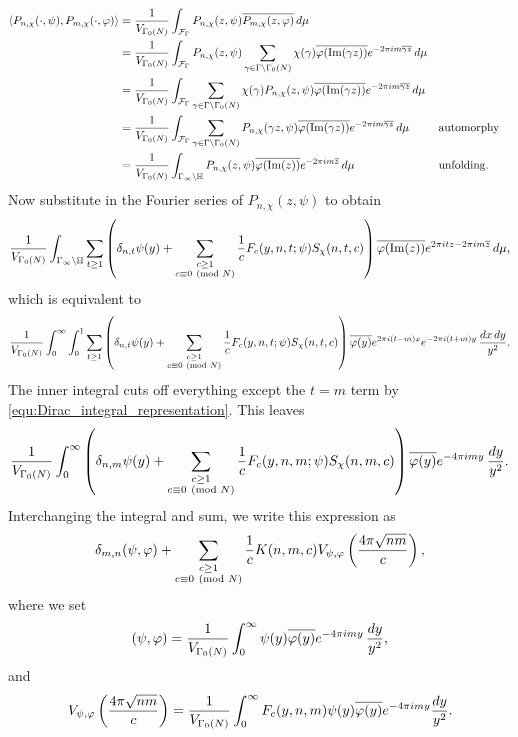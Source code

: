     \begin{align*}
      \langle P_{n,\chi}(\cdot,\psi),P_{m,\chi}(\cdot,\varphi)\rangle &= \frac{1}{V_{\Gamma_{0}(N)}}\int_{\mathcal{F}_{\Gamma}}P_{n,\chi}(z,\psi)\overline{P_{m,\chi}(z,\varphi)}\,d\mu \\
      &= \frac{1}{V_{\Gamma_{0}(N)}}\int_{\mathcal{F}_{\Gamma}}P_{n,\chi}(z,\psi)\sum_{\gamma \in \Gamma\backslash\Gamma_{0}(N)}\chi(\gamma)\overline{\varphi(\mathrm{Im}(\gamma z))}e^{-2\pi im\overline{\gamma z}}\,d\mu \\
      &= \frac{1}{V_{\Gamma_{0}(N)}}\int_{\mathcal{F}_{\Gamma}}\sum_{\gamma \in \Gamma\backslash\Gamma_{0}(N)}\chi(\gamma)P_{n,\chi}(z,\psi)\overline{\varphi(\mathrm{Im}(\gamma z))}e^{-2\pi im\overline{\gamma z}}\,d\mu \\
      &= \frac{1}{V_{\Gamma_{0}(N)}}\int_{\mathcal{F}_{\Gamma}}\sum_{\gamma \in \Gamma\backslash\Gamma_{0}(N)}P_{n,\chi}(\gamma z,\psi)\overline{\varphi(\mathrm{Im}(\gamma z))}e^{-2\pi im\overline{\gamma z}}\,d\mu && \text{automorphy} \\
      &= \frac{1}{V_{\Gamma_{0}(N)}}\int_{\Gamma_{\infty}\backslash\mathbb{H}}P_{n,\chi}(z,\psi)\overline{\varphi(\mathrm{Im}(z))}e^{-2\pi im\overline{z}}\,d\mu && \text{unfolding}.
    \end{align*}
      Now substitute in the Fourier series of $P_{n,\chi}(z,\psi)$ to obtain
      \[
        \frac{1}{V_{\Gamma_{0}(N)}}\int_{\Gamma_{\infty}\backslash\mathbb{H}}\sum_{t \ge 1}\left(\delta_{n,t}\psi(y)+\sum_{\substack{c \ge 1 \\ c \equiv 0 \ \left(\text{mod }N\right)}}\frac{1}{c}F_{c}(y,n,t;\psi)S_{\chi}(n,t,c)\right)\overline{\varphi(\mathrm{Im}(z))}e^{2\pi itz-2\pi im\overline{z}}\,d\mu,
      \]
      which is equivalent to
      \[
        \frac{1}{V_{\Gamma_{0}(N)}}\int_{0}^{\infty}\int_{0}^{1}\sum_{t \ge 1}\left(\delta_{n,t}\psi(y)+\sum_{\substack{c \ge 1 \\ c \equiv 0 \ \left(\text{mod }N\right)}}\frac{1}{c}F_{c}(y,n,t;\psi)S_{\chi}(n,t,c)\right)\overline{\varphi(y)}e^{2\pi i(t-m)x}e^{-2\pi i(t+m)y}\,\frac{dx\,dy}{y^{2}}.
      \]
      The inner integral cuts off everything except the $t = m$ term by \cref{equ:Dirac_integral_representation}. This leaves
      \[
        \frac{1}{V_{\Gamma_{0}(N)}}\int_{0}^{\infty}\left(\delta_{n,m}\psi(y)+\sum_{\substack{c \ge 1 \\ c \equiv 0 \ \left(\text{mod }N\right)}}\frac{1}{c}F_{c}(y,n,m;\psi)S_{\chi}(n,m,c)\right)\overline{\varphi(y)}e^{-4\pi imy}\,\frac{dy}{y^{2}}.
      \]
      Interchanging the integral and sum, we write this expression as
      \[
        \delta_{m,n}(\psi,\varphi)+\sum_{\substack{c \ge 1 \\ c \equiv 0 \ \left(\text{mod }N\right)}}\frac{1}{c}K(n,m,c)V_{\psi,\varphi}\left(\frac{4\pi\sqrt{nm}}{c}\right),
      \]
      where we set
      \[
        (\psi,\varphi) = \frac{1}{V_{\Gamma_{0}(N)}}\int_{0}^{\infty}\psi(y)\overline{\varphi(y)}e^{-4\pi imy}\,\frac{dy}{y^{2}},
      \]
      and
      \[
        V_{\psi,\varphi}\left(\frac{4\pi\sqrt{nm}}{c}\right) = \frac{1}{V_{\Gamma_{0}(N)}}\int_{0}^{\infty}F_{c}(y,n,m)\psi(y)\overline{\varphi(y)}e^{-4\pi imy}\frac{dy}{y^{2}}.
      \]
       \fi